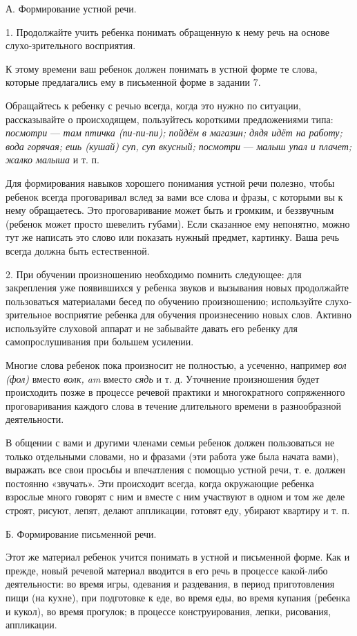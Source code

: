 \documentclass[a5paper]{book}
\renewcommand{\emph}[1]{\textit{#1}}
\begin{document}
А. Формирование устной речи.

1. Продолжайте учить ребенка понимать обращенную к нему речь на основе
слухо-зрительного восприятия.

К этому времени ваш ребенок должен понимать в устной форме те слова,
которые предлагались ему в письменной форме в задании 7.

Обращайтесь к ребенку с речью всегда, когда это нужно по ситуации,
рассказывайте о происходящем, пользуйтесь короткими предложениями типа:
\emph{посмотри} --- \emph{там птичка (пи-пи-пи); пойдём в магазин; дядя
идёт на работу; вода горячая; ешь (кушай) суп, суп вкусный; посмотри}
--- \emph{малыш упал и плачет; жалко малыша} и т. п.

Для формирования навыков хорошего понимания устной речи полезно, чтобы
ребенок всегда проговаривал вслед за вами все слова и фразы, с которыми
вы к нему обращаетесь. Это проговаривание может быть и громким, и
беззвучным (ребенок может просто шевелить губами). Если сказанное ему
непонятно, можно тут же написать это слово или показать нужный предмет,
картинку. Ваша речь всегда должна быть естественной.

2. При обучении произношению необходимо помнить следующее: для
закрепления уже появившихся у ребенка звуков и вызывания новых
продолжайте пользоваться материалами бесед по обучению произношению;
используйте слухо-зрительное восприятие ребенка для обучения
произнесению новых слов. Активно используйте слуховой аппарат и не
забывайте давать его ребенку для самопрослушивания при большем усилении.

Многие слова ребенок пока произносит не полностью, а усеченно, например
\emph{вол (фол)} вместо \emph{волк, am} вместо \emph{сядь} и т. д.
Уточнение произношения будет происходить позже в процессе речевой
практики и многократного сопряженного проговаривания каждого слова в
течение длительного времени в разнообразной деятельности.

В общении с вами и другими членами семьи ребенок должен пользоваться не
только отдельными словами, но и фразами (эти работа уже была начата
вами), выражать все свои просьбы и впечатления с помощью устной речи, т.
е. должен постоянно «звучать». Эти происходит всегда, когда окружающие
ребенка взрослые много говорят с ним и вместе с ним участвуют в одном и
том же деле строят, рисуют, лепят, делают аппликации, готовят еду,
убирают квартиру и т. п.

Б. Формирование письменной речи.

Этот же материал ребенок учится понимать в устной и письменной форме.
Как и прежде, новый речевой материал вводится в его речь в процессе
какой-либо деятельности: во время игры, одевания и раздевания, в период
приготовления пищи (на кухне), при подготовке к еде, во время еды, во
время купания (ребенка и кукол), во время прогулок; в процессе
конструирования, лепки, рисования, аппликации.
\end{document}
